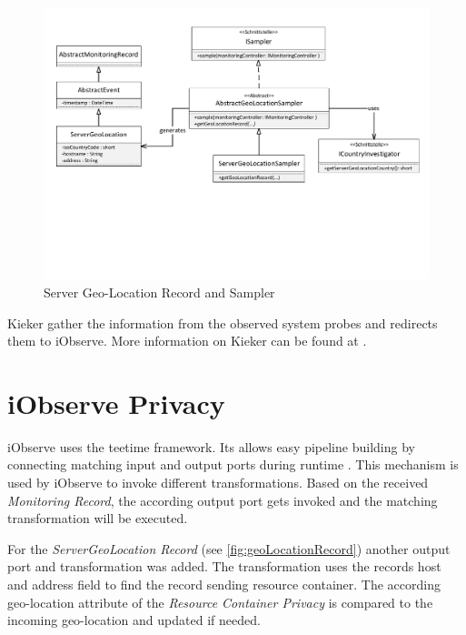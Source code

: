 \begin{figure}[h]
	\centering
	\includegraphics[trim = 10mm 70mm 5mm 5mm, clip, width=1.00\textwidth]{graphs/GeoLocationRecord}
	\caption{Server Geo-Location Record and Sampler}
	\label{fig:geoLocationRecord}
\end{figure}

Kieker gather the information from the observed system probes and redirects them to iObserve. More information on Kieker can be found at \cite{kieker.web}.

\section{iObserve Privacy}
\label{sec:iObserve:privacy}

iObserve uses the teetime framework. Its allows easy pipeline building by connecting matching input and output ports during runtime \cite{teetime.16.05.2017}. This mechanism is used by iObserve to invoke different transformations. Based on the received \textit{Monitoring Record}, the according output port gets invoked and the matching transformation will be executed.

For the \textit{ServerGeoLocation Record} (see \autoref{fig:geoLocationRecord}) another output port and transformation was added. The transformation uses the records host and address field to find the record sending resource container. The according geo-location attribute of the \textit{Resource Container Privacy} is compared to the incoming geo-location and updated if needed.

